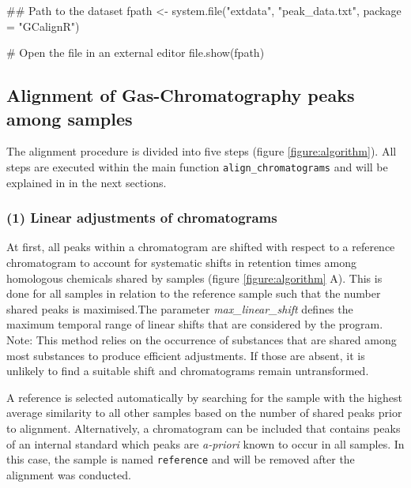 \begin{Schunk}
\begin{Sinput}
## Path to the dataset
fpath <- system.file("extdata", "peak_data.txt", package = "GCalignR")
\end{Sinput}
\end{Schunk}

\begin{Schunk}
\begin{Sinput}
# Open the file in an external editor
file.show(fpath)
\end{Sinput}
\end{Schunk}

\subsection{Alignment of Gas-Chromatography peaks among
samples}\label{alignment-of-gas-chromatography-peaks-among-samples}

The alignment procedure is divided into five steps (figure
\ref{figure:algorithm}). All steps are executed within the main function
\texttt{align\_chromatograms} and will be explained in in the next
sections.

\subsubsection{(1) Linear adjustments of
chromatograms}\label{linear-adjustments-of-chromatograms}

At first, all peaks within a chromatogram are shifted with respect to a
reference chromatogram to account for systematic shifts in retention
times among homologous chemicals shared by samples (figure
\ref{figure:algorithm} A). This is done for all samples in relation to
the reference sample such that the number shared peaks is maximised.The
parameter \emph{max\_linear\_shift} defines the maximum temporal range
of linear shifts that are considered by the program. \newline
Note: This method relies on the occurrence of substances that are shared
among most substances to produce efficient adjustments. If those are
absent, it is unlikely to find a suitable shift and chromatograms remain
untransformed. \par
A reference is selected automatically by searching for the sample with
the highest average similarity to all other samples based on the number
of shared peaks prior to alignment. Alternatively, a chromatogram can be
included that contains peaks of an internal standard which peaks are
\emph{a-priori} known to occur in all samples. In this case, the sample
is named \texttt{reference} and will be removed after the alignment was
conducted.

